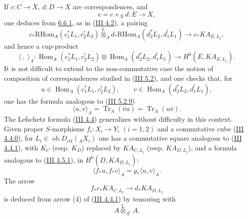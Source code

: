 \documentclass[11pt]{article}
\DeclareMathOperator{\Hom}{Hom}
\providecommand{\RHom}{\mathrm{RHom}}
\providecommand{\Tr}{\operatorname{Tr}}
\providecommand{\Tr}{\operatorname{Tr}}
\providecommand{\lten}{\overset{\mathrm L}{\otimes}}
\providecommand{\Ob}{\operatorname{ob}}
\providecommand{\Tr}{\operatorname{Tr}}
\providecommand{\RHom}{\mathrm{RHom}}
\providecommand{\Hom}{\operatorname{Hom}}
\providecommand{\lten}{\overset{\mathrm L}{\otimes}}
\providecommand{\RHom}{\mathrm R\mathcal{H}om}
\providecommand{\lten}{\overset{\mathrm L}{\otimes}}
\providecommand{\Ob}{\operatorname{ob}}
\providecommand{\Tr}{\operatorname{Tr}}
\providecommand{\lten}{\overset{\mathrm L}{\otimes}}
\providecommand{\lten}{\overset{\mathrm L}{\otimes}}
\providecommand{\Ob}{\operatorname{Ob}}
\providecommand{\lten}{\overset{\mathrm L}{\otimes}}
\providecommand{\RHom}{\mathrm{RHom}}
\providecommand{\Hom}{\operatorname{Hom}}
\providecommand{\Tr}{\operatorname{Tr}}
\providecommand{\Ob}{\operatorname{ob}}
\providecommand{\Ob}{\operatorname{Ob}}
\providecommand{\lten}{\overset{\mathrm L}{\otimes}}
\begin{document}
If $c:C\to X$, $d:D\to X$ are correspondences, and
\[
e=c\times_Xd:E\to X,
\]
one deduces from \hyperref[sga5:IIIB:equation:6.6.1]{6.6.1}, as in (\hyperref[sga5:III:subsection:4.2]{III 4.2}), a pairing
\begin{equation}
c_*\RHom_A(c_1^*L_1,c_2^!L_2)
\lten_{\Lambda}
d_*\RHom_A(d_2^*L_2,d_1^!L_1)
\longrightarrow
e_*KA_{E,L_{\natural}},
\tag{6.6.2}\label{sga5:IIIB:equation:6.6.2}
\end{equation}
and hence a cup-product
\begin{equation}
\langle\ ,\ \rangle_A:
\Hom_A(c_1^*L_1,c_2^!L_2)\otimes
\Hom_A(d_2^*L_2,d_1^!L_1)
\longrightarrow
H^0(E,KA_{E,L_{\natural}}).
\tag{6.6.3}\label{sga5:IIIB:equation:6.6.3}
\end{equation}
It is not difficult to extend to the non-commutative case the notion of composition of correspondences studied in (\hyperref[sga5:III:subsection:5.2]{III 5.2}), and one checks that, for
\[
u\in\Hom_A(c_1^*L_1,c_2^!L_2),\qquad
v\in\Hom_A(d_2^*L_2,d_1^!L_1),
\]
one has the formula analogous to (\hyperref[sga5:III:equation:5.2.9]{III 5.2.9})
\begin{equation}
\langle u,v\rangle_A=\Tr_A(\bar vu)=\Tr_A(u\bar v).
\tag{6.6.4}\label{sga5:IIIB:equation:6.6.4}
\end{equation}
The Lefschetz formula (\hyperref[sga5:III:theorem:4.4]{III 4.4}) generalizes without difficulty in this context. Given proper $S$-morphisms $f_i:X_i\to Y_i$ $(i=1,2)$ and a commutative cube (\hyperref[sga5:III:equation:4.4.0]{III 4.4.0}), for $L_i\in\Ob D_{\mathrm{ctf}}({}_AX_i)$ one has a commutative square analogous to (\hyperref[sga5:III:equation:4.4.1]{III 4.4.1}), with $K_C$ (resp. $K_D$) replaced by $KA_{C,L_{\natural}}$ (resp. $KA_{D,L_{\natural}}$), and a formula analogous to (\hyperref[sga5:III:equation:4.5.1]{III 4.5.1}), in $H^0(D,KA_{D,L_{\natural}})$:
\begin{equation}
\langle f_*u,f_*v\rangle_A=g_*\langle u,v\rangle_A.
\tag{6.6.5}\label{sga5:IIIB:equation:6.6.5}
\end{equation}
The arrow
\[
f_*c_*KA_{C,L_{\natural}}\longrightarrow d_*KA_{D,L_{\natural}}
\]
is deduced from arrow (4) of (\hyperref[sga5:III:equation:4.4.1]{III 4.4.1}) by tensoring with
\[
A\lten_{A^e}A .
\]
\end{document}
